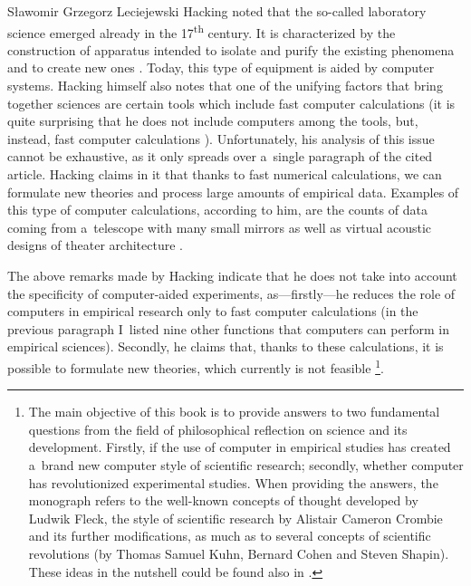 \begin{artengenv}{Sławomir Grzegorz Leciejewski}
Hacking noted that the so-called laboratory science emerged already in the 17\textsuperscript{th} century. It is characterized by the construction of apparatus intended to isolate and purify the existing phenomena and to create new ones 
\parencite[][]{hacking_disunities_1996}. %
 Today, this type of equipment is aided by computer systems. Hacking himself also notes that one of the unifying factors that bring together sciences are certain tools which include fast computer calculations (it is quite surprising that he does not include computers among the tools, but, instead, fast computer calculations 
\parencite[][]{hacking_disunities_1996}%
). Unfortunately, his analysis of this issue cannot be exhaustive, as it only spreads over a~single paragraph of the cited article. Hacking claims in it that thanks to fast numerical calculations, we can formulate new theories and process large amounts of empirical data. Examples of this type of computer calculations, according to him, are the counts of data coming from a~telescope with many small mirrors as well as virtual acoustic designs of theater architecture 
\parencite[][]{hacking_disunities_1996}.%




The above remarks made by Hacking indicate that he does not take into account the specificity of computer-aided experiments, as---firstly---he reduces the role of computers in empirical research only to fast computer calculations (in the previous paragraph I~listed nine other functions that computers can perform in empirical sciences). Secondly, he claims that, thanks to these calculations, it is possible to formulate new theories, which currently is not feasible 
\parencite[][pp.86–93]{leciejewski_cyfrowa_2013}%
\footnote{The main objective of this book is to provide answers to two fundamental questions from the field of philosophical reflection on science and its development. Firstly, if the use of computer in empirical studies has created a~brand new computer style of scientific research; secondly, whether computer has revolutionized experimental studies. When providing the answers, the monograph refers to the well-known concepts of thought developed by Ludwik Fleck, the style of scientific research by Alistair Cameron Crombie and its further modifications, as much as to several concepts of scientific revolutions (by Thomas Samuel Kuhn, Bernard Cohen and Steven Shapin). These ideas in the nutshell could be found also in 
\parencite[][]{leciejewski_struktura_2018}.%
}.




\end{artengenv}

